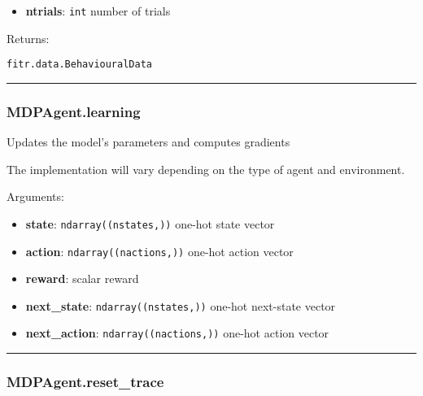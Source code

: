 \begin{itemize}
\tightlist
\item
  \textbf{ntrials}: \texttt{int} number of trials
\end{itemize}

Returns:

\texttt{fitr.data.BehaviouralData}

\begin{center}\rule{0.5\linewidth}{\linethickness}\end{center}

\subsubsection{MDPAgent.learning}\label{mdpagent.learning}

\begin{Shaded}
\begin{Highlighting}[]
\end{Highlighting}
\end{Shaded}

Updates the model's parameters and computes gradients

The implementation will vary depending on the type of agent and
environment.

Arguments:

\begin{itemize}
\tightlist
\item
  \textbf{state}: \texttt{ndarray((nstates,))} one-hot state vector
\item
  \textbf{action}: \texttt{ndarray((nactions,))} one-hot action vector
\item
  \textbf{reward}: scalar reward
\item
  \textbf{next\_state}: \texttt{ndarray((nstates,))} one-hot next-state
  vector
\item
  \textbf{next\_action}: \texttt{ndarray((nactions,))} one-hot action
  vector
\end{itemize}

\begin{center}\rule{0.5\linewidth}{\linethickness}\end{center}

\subsubsection{MDPAgent.reset\_trace}\label{mdpagent.reset_trace}

